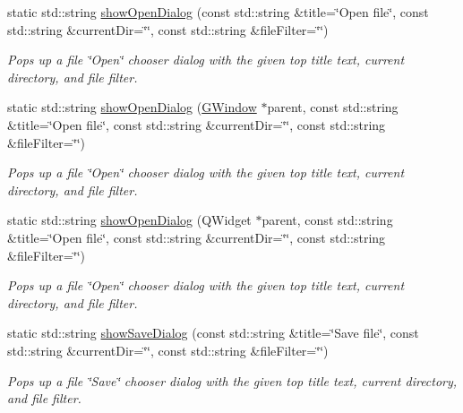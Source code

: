 \begin{DoxyCompactItemize}
\item 
static std\+::string \mbox{\hyperlink{classGFileChooser_abe21d73a151b976a4f639005b9652407}{show\+Open\+Dialog}} (const std\+::string \&title=\char`\"{}Open file\char`\"{}, const std\+::string \&current\+Dir=\char`\"{}\char`\"{}, const std\+::string \&file\+Filter=\char`\"{}\char`\"{})
\begin{DoxyCompactList}\small\item\em Pops up a file \char`\"{}\+Open\char`\"{} chooser dialog with the given top title text, current directory, and file filter. \end{DoxyCompactList}\item 
static std\+::string \mbox{\hyperlink{classGFileChooser_aceba7f99cdc44bebbb08a67a9ba32ab0}{show\+Open\+Dialog}} (\mbox{\hyperlink{classGWindow}{G\+Window}} $\ast$parent, const std\+::string \&title=\char`\"{}Open file\char`\"{}, const std\+::string \&current\+Dir=\char`\"{}\char`\"{}, const std\+::string \&file\+Filter=\char`\"{}\char`\"{})
\begin{DoxyCompactList}\small\item\em Pops up a file \char`\"{}\+Open\char`\"{} chooser dialog with the given top title text, current directory, and file filter. \end{DoxyCompactList}\item 
static std\+::string \mbox{\hyperlink{classGFileChooser_a1afbae9ad77732453d6978d3f643ce0b}{show\+Open\+Dialog}} (Q\+Widget $\ast$parent, const std\+::string \&title=\char`\"{}Open file\char`\"{}, const std\+::string \&current\+Dir=\char`\"{}\char`\"{}, const std\+::string \&file\+Filter=\char`\"{}\char`\"{})
\begin{DoxyCompactList}\small\item\em Pops up a file \char`\"{}\+Open\char`\"{} chooser dialog with the given top title text, current directory, and file filter. \end{DoxyCompactList}\item 
static std\+::string \mbox{\hyperlink{classGFileChooser_a67fbf8f6091d781f22431051e3e83561}{show\+Save\+Dialog}} (const std\+::string \&title=\char`\"{}Save file\char`\"{}, const std\+::string \&current\+Dir=\char`\"{}\char`\"{}, const std\+::string \&file\+Filter=\char`\"{}\char`\"{})
\begin{DoxyCompactList}\small\item\em Pops up a file \char`\"{}\+Save\char`\"{} chooser dialog with the given top title text, current directory, and file filter. \end{DoxyCompactList}\item 

\end{DoxyCompactItemize}
